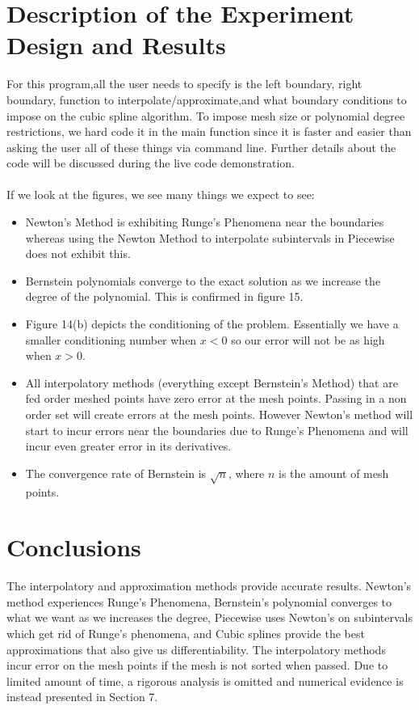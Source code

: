 \documentclass[12pt]{article}
\theoremstyle{remark}
\begin{document}
\pagebreak

\section{Description of the Experiment Design and Results}

For this program,all the user needs to specify is the left boundary, right boundary, function to interpolate/approximate,and what boundary conditions to impose on the cubic spline algorithm. To impose mesh size or polynomial degree restrictions, we hard code it in the main function since it is faster and easier than asking the user all of these things via command line. Further details about the code will be discussed during the live code demonstration.  \\ \\

If we look at the figures, we see many things we expect to see:
\begin{itemize}
	\item Newton's Method is exhibiting Runge's Phenomena near the boundaries whereas using the Newton Method to interpolate subintervals in Piecewise does not exhibit this.
	\item Bernstein polynomials converge to the exact solution as we increase the degree of the polynomial. This is confirmed in figure 15.
	\item Figure 14(b) depicts the conditioning of the problem. Essentially we have a smaller conditioning number when $x < 0$ so our error will not be as high when $x > 0$.
	\item All interpolatory methods (everything except Bernstein's Method) that are fed order meshed points have zero error at the mesh points. Passing in a non order set will create errors at the mesh points. However Newton's method will start to incur errors near the boundaries due to Runge's Phenomena and will incur even greater error in its derivatives.
	\item The convergence rate of Bernstein is $\sqrt{n}$, where $n$ is the amount of mesh points.
\end{itemize}

\section{Conclusions}

The interpolatory and approximation methods provide accurate results. Newton's method experiences Runge's Phenomena, Bernstein's polynomial converges to what we want as we increases the degree, Piecewise uses Newton's on subintervals which get rid of Runge's phenomena, and Cubic splines provide the best approximations that also give us differentiability. The interpolatory methods incur error on the mesh points if the mesh is not sorted when passed. Due to limited amount of time, a rigorous analysis is omitted and numerical evidence is instead presented in Section 7.
\end{document}
